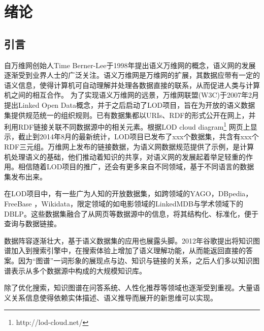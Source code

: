 \chapter{绪论}
\label{cha:intro}

\section{引言}

自万维网创始人Time Berner-Lee于1998年提出语义万维网的概念\cite{berners1998semantic}，语义网的发展逐渐受到业界人士的广泛关注。语义万维网是万维网的扩展，其数据应带有一定的语义信息，使得计算机可自动理解并处理各数据直接的联系，从而促进人类与计算机之间的相互合作。
为了实现语义万维网的远景，万维网联盟(W3C)于2007年2月提出Linked Open Data概念，并于之后启动了LOD项目，旨在为开放的语义数据集提供规范统一的组织规则。已有数据集都以URIs、RDF的形式公开在网上，并利用RDF链接关联不同数据源中的相关元素\cite{bizer2009linked}。根据LOD cloud diagram\footnote{http://lod-cloud.net/} 网页上显示，截止到2014年8月的最新统计，LOD项目已发布了xxx个数据集，共含有xxx个RDF三元组。万维网上发布的链接数据，为语义网数据规范提供了示例，是计算机处理语义的基础，他们推动着知识的共享，对语义网的发展起着举足轻重的作用。相信随着LOD项目的推广，还会有更多来自不同领域，基于不同语言的数据集发布出来。

在LOD项目中，有一些广为人知的开放数据集，如跨领域的YAGO\cite{suchanek2007yago,suchanek2008yago,hoffart2013yago2,mahdisoltani2014yago3}，DBpedia\cite{auer2007dbpedia,bizer2009dbpedia,lehmann2015dbpedia}，FreeBase \cite{bollacker2008freebase}，Wikidata\cite{vrandevcic2014wikidata,erxleben2014introducing}，限定领域的如电影领域的LinkedMDB\cite{hassanzadeh2009linked}与学术领域下的DBLP。这些数据集融合了从网页等数据源中的信息，将其结构化、标准化，便于查询与数据链接。

数据阵容逐渐壮大，基于语义数据集的应用也展露头脚。2012年谷歌提出将知识图谱\cite{singhal2012introducing}加入到搜索引擎中，在搜索体验上增加了语义理解功能，从而能返回直接的答案。因为“图谱”一词形象的展现点与边、知识与链接的关系，之后人们多以知识图谱表示从多个数据源中构成的大规模知识库。

除了优化搜索，知识图谱在问答系统\cite{yih2015semantic,yang2014joint}、人性化推荐\cite{kaminskas2012knowledge}等领域也逐渐受到重视。大量语义关系信息使得依赖实体描述、语义推导而展开的新思维可以实现。

